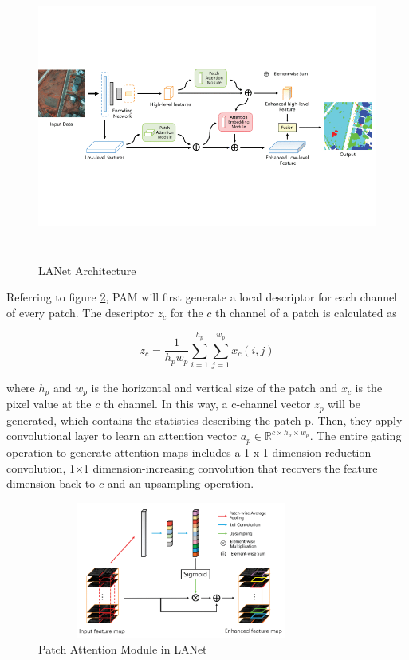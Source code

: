 \FloatBarrier
\begin{figure}[ht]
\includegraphics[width=12.5cm, height=9.5cm]{images/lanet.png}
\centering
\caption{LANet Architecture \protect\cite{lanet}}
\label{fig:lanet}
\end{figure}

\FloatBarrier

Referring to figure \ref{fig:pam}, PAM will first generate a local descriptor for each channel of every patch. The descriptor $z_c$ for the $c$ th channel of a patch is calculated as

\begin{equation}
    z_c = \frac{1}{h_p w_p} \sum_{i=1}^{h_p} \sum_{j=1}^{w_p} x_c(i,j)
\end{equation}

where $h_p$ and $w_p$ is the horizontal and vertical size of the patch and $x_c$ is the pixel value at the $c$ th channel. In this way, a c-channel vector $z_p$ will be generated, which contains the statistics describing the patch p. Then, they apply convolutional layer to learn an attention vector $a_p \in \mathbb{R}^{c \times h_p \times w_p}$. The entire gating operation to generate attention maps includes a 1 x 1 dimension-reduction convolution, 1×1 dimension-increasing convolution that recovers the feature dimension back to $c$ and an upsampling operation.
\begin{figure}[ht]
\includegraphics[width=9.5cm, height=4.5cm]{images/pam.png}
\centering
\caption{Patch Attention Module in LANet \protect\cite{lanet}}
\label{fig:pam}
\end{figure}
\FloatBarrier

